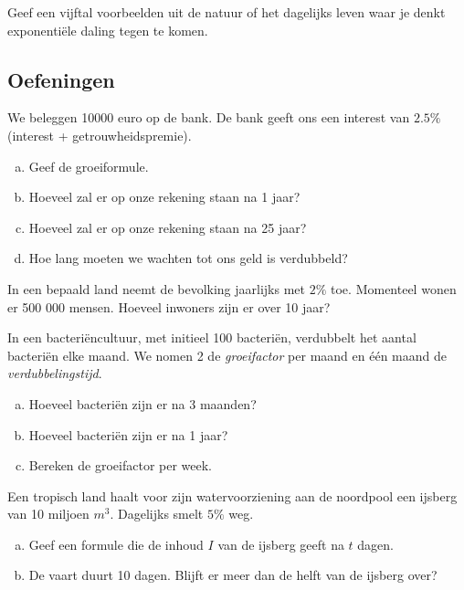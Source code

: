 \documentclass[12pt,twoside]{article}
\begin{document}
\begin{oefening}
Geef een vijftal voorbeelden uit de natuur of het dagelijks leven waar je denkt exponentiële daling tegen te komen.
\end{oefening}

\subsection{Oefeningen}

\begin{oefening}
We beleggen 10000 euro op de bank. De bank geeft ons een interest van $2.5\%$ (interest + getrouwheidspremie).
\begin{enumerate}[(a)]
  \item Geef de groeiformule.
  \item Hoeveel zal er op onze rekening staan na 1 jaar?
  \item Hoeveel zal er op onze rekening staan na 25 jaar?
  \item Hoe lang moeten we wachten tot ons geld is verdubbeld?
\end{enumerate}
\end{oefening}

\begin{oefening}
In een bepaald land neemt de bevolking jaarlijks met $2\%$ toe. Momenteel wonen er 500 000 mensen. Hoeveel inwoners zijn er over 10 jaar?
\end{oefening}

\begin{oefening} %
In een bacteriëncultuur, met initieel 100 bacteriën, verdubbelt het aantal bacteriën elke maand. We nomen 2 de {\em groeifactor} per maand en één maand de {\em verdubbelingstijd}.
\begin{enumerate}[(a)]
  \item Hoeveel bacteriën zijn er na 3 maanden?
  \item Hoeveel bacteriën zijn er na 1 jaar?
  \item Bereken de groeifactor per week.
\end{enumerate}
\end{oefening}

\begin{oefening} %
Een tropisch land haalt voor zijn watervoorziening aan de noordpool een ijsberg van 10 miljoen $m^3$. Dagelijks smelt $5\%$ weg.
\begin{enumerate}[(a)]
  \item Geef een formule die de inhoud $I$ van de ijsberg geeft na $t$ dagen.
  \item De vaart duurt 10 dagen. Blijft er meer dan de helft van de ijsberg over?
\end{enumerate}
\end{oefening}
\end{document}
